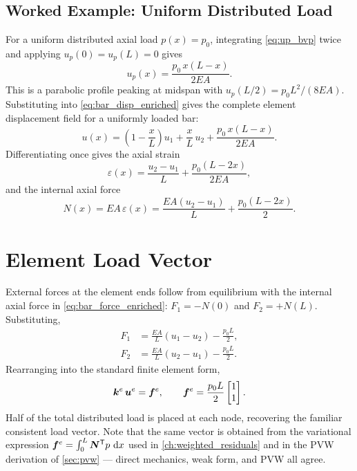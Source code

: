 \subsection{Worked Example: Uniform Distributed Load}
\label{sec:bar_uniform_load}

For a uniform distributed axial load $p(x) = p_0$, integrating
\cref{eq:up_bvp} twice and applying $u_p(0)=u_p(L)=0$ gives
\begin{equation}
    u_p(x) = \frac{p_0\,x(L - x)}{2EA} .
    \label{eq:up_uniform}
\end{equation}
This is a parabolic profile peaking at midspan with
$u_p(L/2) = p_0 L^2/(8EA)$. Substituting into \cref{eq:bar_disp_enriched}
gives the complete element displacement field for a uniformly loaded bar:
\begin{equation}
    u(x) = \left(1-\frac{x}{L}\right)u_1
         + \frac{x}{L}\,u_2
         + \frac{p_0\,x(L-x)}{2EA} .
    \label{eq:bar_disp_uniform}
\end{equation}
Differentiating once gives the axial strain
\begin{equation}
    \varepsilon(x) = \frac{u_2-u_1}{L}
                  + \frac{p_0(L-2x)}{2EA} ,
    \label{eq:bar_strain_enriched}
\end{equation}
and the internal axial force
\begin{equation}
    N(x) = EA\,\varepsilon(x)
         = \frac{EA(u_2-u_1)}{L} + \frac{p_0(L-2x)}{2} .
    \label{eq:bar_force_enriched}
\end{equation}

\section{Element Load Vector}

External forces at the element ends follow from equilibrium with the internal
axial force in \cref{eq:bar_force_enriched}: $F_1 = -N(0)$ and $F_2 = +N(L)$.
Substituting,
\begin{align}
    F_1 &= \frac{EA}{L}(u_1-u_2) - \frac{p_0 L}{2}, \\
    F_2 &= \frac{EA}{L}(u_2-u_1) - \frac{p_0 L}{2} .
\end{align}
Rearranging into the standard finite element form,
\begin{equation}
    \bm{k}^e\,\bm{u}^e = \bm{f}^e ,
    \qquad
    \bm{f}^e = \frac{p_0 L}{2}\begin{bmatrix} 1 \\ 1 \end{bmatrix} .
    \label{eq:bar_load}
\end{equation}
Half of the total distributed load is placed at each node, recovering the
familiar consistent load vector. Note that the same vector is obtained from
the variational expression $\bm{f}^e = \int_0^L \bm{N}^{\mathsf{T}} p\,\,\mathrm{d} x$
used in \cref{ch:weighted_residuals} and in the PVW derivation of
\cref{sec:pvw} — direct mechanics, weak form, and PVW all agree.

